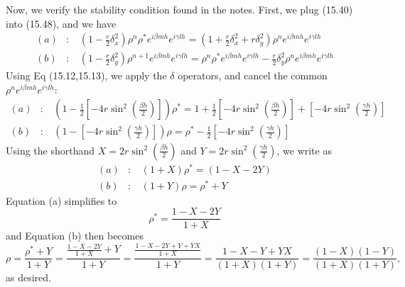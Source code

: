 \documentclass[11pt]{article}
\def\f{\frac }
\begin{document}
\begin{enumerate}
Now, we verify the stability condition found in the notes.
First, we plug (15.40) into (15.48), and we have
\begin{align*} (a) &: ~~~~ \left ( 1 - \f{r}{2}\delta _x ^2 \right ) \rho ^n \rho ^* e^{i\beta m h } e^{ i \gamma l h} = \left ( 1  + \f{r}{2} \delta _x ^2 + r \delta _y ^2 \right ) \rho^n e^{i\beta m h } e^{ i \gamma l h}\\
(b) &: ~~~~ \left ( 1 - \f{r}{2}\delta _y ^2  \right ) \rho^{n+1}  e^{i\beta m h } e^{ i \gamma l h} = \rho^n \rho ^* e^{i\beta m h } e^{ i \gamma l h} - \f{r}{2} \delta _y ^2 \rho ^n e^{i\beta m h } e^{ i \gamma l h} \end{align*} 
Using Eq (15.12,15.13), we apply the $\delta$ operators, and cancel the common $\rho ^n e^{i\beta m h } e^{ i \gamma l h}$:
\begin{align*} (a) &: ~~~~ \left ( 1 - \f{1}{2} \left [ -4r \sin ^2 \left (\f{\beta h}{2} \right ) \right ] \right ) \rho ^* = 1  + \f{1}{2} \left [ -4r \sin ^2 \left (\f{\beta h}{2} \right ) \right ] + \left [ -4r \sin ^2 \left (\f{\gamma h}{2} \right ) \right ] \\
(b) &: ~~~~ \left ( 1 - \left [ -4r \sin ^2 \left (\f{\gamma h}{2} \right ) \right ] \right ) \rho = \rho ^* - \f{1}{2} \left [ -4r \sin ^2 \left (\f{\gamma h}{2} \right ) \right ] \end{align*} 
Using the shorthand $X = 2r \sin ^2 \left (\f{\beta h}{2} \right )$ and $Y = 2r \sin ^2 \left (\f{\gamma h}{2} \right )$, we write as
\begin{align*} (a) &: ~~~~ \left ( 1 + X \right ) \rho ^* = \left ( 1 - X - 2Y \right )  \\
(b) &: ~~~~ \left ( 1 + Y \right  ) \rho = \rho ^* + Y \end{align*} 
Equation (a) simplifies to
\[ \rho ^* = \f{1-X-2Y}{1+X} \]
and Equation (b) then becomes
\[ \rho = \f{\rho ^* + Y}{1+Y} = \f{\f{1-X-2Y}{1+X} + Y}{1+Y} = \f{\f{1-X-2Y+Y+YX}{1+X}}{1+Y} = \f{1-X-Y+YX}{(1+X)(1+Y)} = \f{(1-X)(1-Y)}{(1+X)(1+Y)}, \]
as desired.


\end{enumerate}
\end{document}
